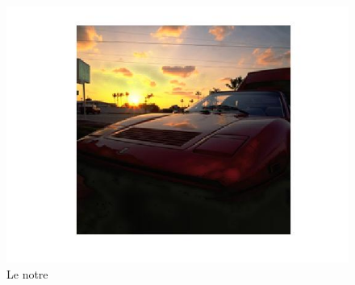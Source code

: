 \documentclass{article}
\begin{document}
\begin{figure}[h]
\begin{minipage}{0.33\textwidth}
\includegraphics[width=1\textwidth]{images/ferrari_conc_tmr.jpg}
\caption{Le notre}
\end{minipage}
\end{figure}
\end{document}
